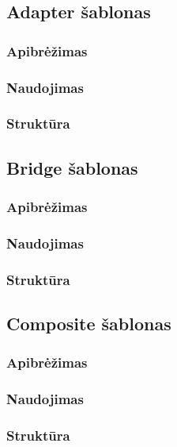 \documentclass[10pt]{IEEEtran}
\begin{document}
		\subsection{Adapter šablonas}

			\subsubsection{Apibrėžimas}

			\subsubsection{Naudojimas}

			\subsubsection{Struktūra}

		\subsection{Bridge šablonas}

			\subsubsection{Apibrėžimas}

			\subsubsection{Naudojimas}

			\subsubsection{Struktūra}

		\subsection{Composite šablonas}

			\subsubsection{Apibrėžimas}

			\subsubsection{Naudojimas}

			\subsubsection{Struktūra}
\end{document}
